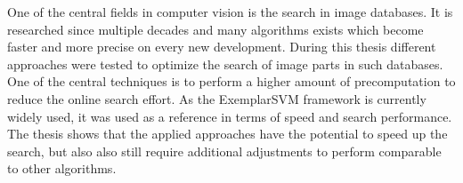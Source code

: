 One of the central fields in computer vision is the search in image databases. It is researched since multiple decades and many algorithms exists which become faster and more precise on every new development. During this thesis different approaches were tested to optimize the search of image parts in such databases. One of the central techniques is to perform a higher amount of precomputation to reduce the online search effort. As the ExemplarSVM framework \cite{Malisiewicz2011} is currently widely used, it was used as a reference in terms of speed and search performance. The thesis shows that the applied approaches have the potential to speed up the search, but also also still require additional adjustments to perform comparable to other algorithms.